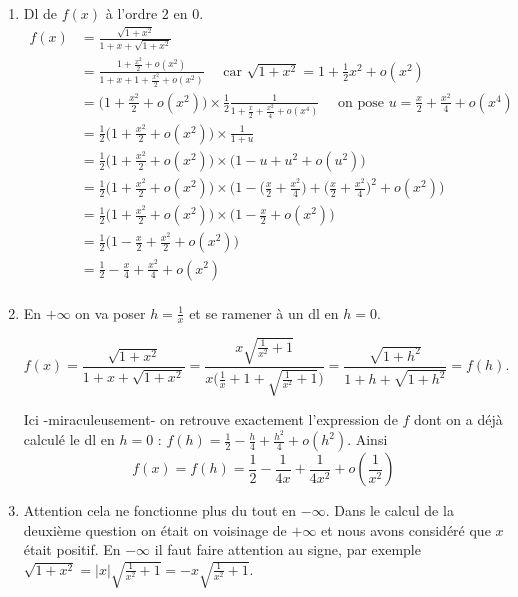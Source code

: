 \documentclass[11pt,a4paper]{article}
\begin{document}
\begin{enumerate}
  \item Dl de $f(x)$ à l'ordre $2$ en $0$.
\begin{align*}
f(x) 
  & =   \frac{\sqrt{1+x^2}}{1+x+\sqrt{1+x^2}} \\
  & = \frac{1+\frac{x^2}{2} + o(x^2)}{1 + x + 1+\frac{x^2}{2} + o(x^2)} 
\quad \text{ car } \sqrt{1+x^2} = 1 + \frac12 x^2+o(x^2) \\  
  & = \big(1+\frac{x^2}{2} + o(x^2) \big) \times \frac 12 \frac{1}{1+\frac{x}{2}+\frac{x^2}{4} + o(x^4)} 
\quad \text{ on pose } u=\frac{x}{2}+\frac{x^2}{4} + o(x^4)  \\
  & = \frac 12 \big(1+\frac{x^2}{2} + o(x^2) \big) \times \frac{1}{1+u} \\
  & = \frac 12 \big(1+\frac{x^2}{2} + o(x^2) \big) \times \big(1-u+u^2+o(u^2)\big)  \\
  & = \frac 12 \big(1+\frac{x^2}{2} + o(x^2) \big) \times \big(1- \big(\frac{x}{2}+\frac{x^2}{4}\big) + \big(\frac{x}{2}+\frac{x^2}{4}\big)^2+o(x^2)\big)  \\
  & = \frac 12 \big(1+\frac{x^2}{2} + o(x^2) \big) \times \big(1- \frac{x}{2}+o(x^2)\big)  \\
  & = \frac 12 \big(1- \frac{x}{2}+\frac{x^2}{2} + o(x^2) \big)  \\
  & = \frac 12 - \frac{x}{4}+\frac{x^2}{4} + o(x^2)   \\ 
\end{align*}

  \item En $+\infty$ on va poser $h=\frac1x$ et se ramener à un dl en $h=0$.

$$f(x)= \frac{\sqrt{1+x^2}}{1+x+\sqrt{1+x^2}} =  \frac{x\sqrt{\frac{1}{x^2}+1}}{x\big(\frac1x+1+\sqrt{\frac{1}{x^2}+1}\big)}
=  \frac{\sqrt{1+h^2}}{1+h+\sqrt{1+h^2}} = f(h).$$

Ici -miraculeusement- on retrouve exactement l'expression de $f$ dont on a déjà calculé le dl en $h=0$ :
$f(h) =  \frac 12 - \frac{h}{4}+\frac{h^2}{4} + o(h^2)$. Ainsi 
$$f(x) = f(h) = \frac 12 - \frac{1}{4x}+\frac{1}{4x^2} + o(\frac1{x^2})$$

  \item Attention cela ne fonctionne plus du tout en $-\infty$.
Dans le calcul de la deuxième question on était on voisinage de $+\infty$ et nous avons considéré que $x$ était positif.
En $-\infty$ il faut faire attention au signe, par exemple $\sqrt{1+x^2}= |x|\sqrt{\frac{1}{x^2}+1} = -x \sqrt{\frac{1}{x^2}+1}$.


\end{enumerate}
\end{document}
